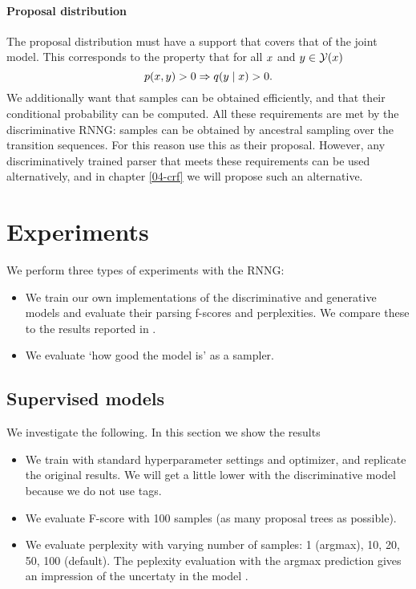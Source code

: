 \paragraph{Proposal distribution}
The proposal distribution must have a support that covers that of the joint model. This corresponds to the property that for all $x$ and $y \in \mathcal{Y}(x)$
\begin{equation*}
  p(x, y) > 0 \Rightarrow q( y \mid x ) > 0.
\end{equation*}
We additionally want that samples can be obtained efficiently, and that their conditional probability can be computed. All these requirements are met by the discriminative RNNG: samples can be obtained by ancestral sampling over the transition sequences. For this reason \citet{dyer2016rnng} use this as their proposal. However, any discriminatively trained parser that meets these requirements can be used alternatively, and in chapter \ref{04-crf} we will propose such an alternative.

\section{Experiments}
We perform three types of experiments with the RNNG:
\begin{itemize}
  \item We train our own implementations of the discriminative and generative models and evaluate their parsing f-scores and perplexities. We compare these to the results reported in \citep{dyer2016rnng}.
  \item We evaluate `how good the model is' as a sampler.
\end{itemize}

\subsection{Supervised models} We investigate the following.
In this section we show the results
\begin{itemize}
  \item We train with standard hyperparameter settings and optimizer, and replicate the original results. We will get a little lower with the discriminative model because we do not use tags.
  \item We evaluate F-score with 100 samples (as many proposal trees as possible).
  \item We evaluate perplexity with varying number of samples: 1 (argmax), 10, 20, 50, 100 (default). The peplexity evaluation with the argmax prediction gives an impression of the uncertaty in the model \citep{buys2018exact}.
\end{itemize}

